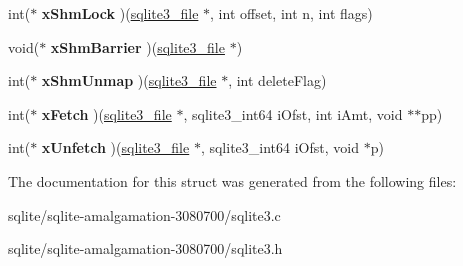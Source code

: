 \begin{DoxyCompactItemize}
\item 
\hypertarget{structsqlite3__io__methods_a58f4a6b0df86440029cc5fa1b65b1b4e}{int($\ast$ {\bfseries x\+Shm\+Lock} )(\hyperlink{structsqlite3__file}{sqlite3\+\_\+file} $\ast$, int offset, int n, int flags)}\label{structsqlite3__io__methods_a58f4a6b0df86440029cc5fa1b65b1b4e}

\item 
\hypertarget{structsqlite3__io__methods_aedf4a59fa25ad33e0625a2aa0f6f2184}{void($\ast$ {\bfseries x\+Shm\+Barrier} )(\hyperlink{structsqlite3__file}{sqlite3\+\_\+file} $\ast$)}\label{structsqlite3__io__methods_aedf4a59fa25ad33e0625a2aa0f6f2184}

\item 
\hypertarget{structsqlite3__io__methods_af69cbc7ece1854576ac262f986871563}{int($\ast$ {\bfseries x\+Shm\+Unmap} )(\hyperlink{structsqlite3__file}{sqlite3\+\_\+file} $\ast$, int delete\+Flag)}\label{structsqlite3__io__methods_af69cbc7ece1854576ac262f986871563}

\item 
\hypertarget{structsqlite3__io__methods_ad817335f15cad777b60d973f73cb542c}{int($\ast$ {\bfseries x\+Fetch} )(\hyperlink{structsqlite3__file}{sqlite3\+\_\+file} $\ast$, sqlite3\+\_\+int64 i\+Ofst, int i\+Amt, void $\ast$$\ast$pp)}\label{structsqlite3__io__methods_ad817335f15cad777b60d973f73cb542c}

\item 
\hypertarget{structsqlite3__io__methods_a81c025bf5851547d47ceef8e83214692}{int($\ast$ {\bfseries x\+Unfetch} )(\hyperlink{structsqlite3__file}{sqlite3\+\_\+file} $\ast$, sqlite3\+\_\+int64 i\+Ofst, void $\ast$p)}\label{structsqlite3__io__methods_a81c025bf5851547d47ceef8e83214692}

\end{DoxyCompactItemize}


The documentation for this struct was generated from the following files\+:\begin{DoxyCompactItemize}
\item 
sqlite/sqlite-\/amalgamation-\/3080700/sqlite3.\+c\item 
sqlite/sqlite-\/amalgamation-\/3080700/sqlite3.\+h\end{DoxyCompactItemize}
